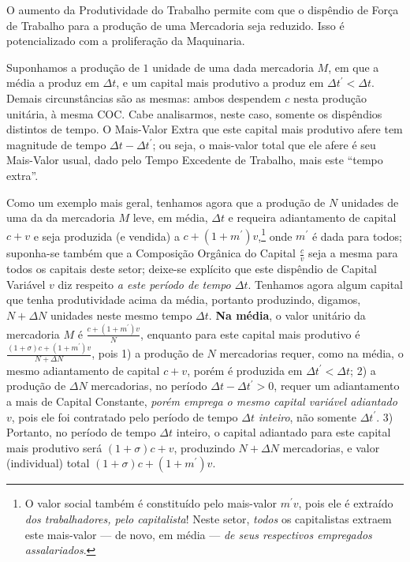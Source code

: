 \documentclass[12pt]{article}
\numberwithin{equation}{section}
\theoremstyle{plain}
\theoremstyle{definition}
\theoremstyle{remark}
\begin{document}
O aumento da Produtividade do Trabalho permite com que o dispêndio de Força de Trabalho para a produção de uma Mercadoria seja reduzido. Isso é potencializado com a proliferação da Maquinaria.

Suponhamos a produção de \(1\) unidade de uma dada mercadoria \(M\), em que a média a produz em \(\Delta t\), e um capital mais produtivo a produz em \(\Delta t^{\prime}<\Delta t\). Demais circunstâncias são as mesmas: ambos despendem \(c\) nesta produção unitária, à mesma COC. Cabe analisarmos, neste caso, somente os dispêndios distintos de tempo. O Mais-Valor Extra que este capital mais produtivo afere tem magnitude de tempo \(\Delta t-\Delta t^{\prime}\); ou seja, o mais-valor total que ele afere é seu Mais-Valor usual, dado pelo Tempo Excedente de Trabalho, mais este ``tempo extra''.

Como um exemplo mais geral, tenhamos agora que a produção de \(N\) unidades de uma da da mercadoria \(M\) leve, em média, \(\Delta t\) e requeira adiantamento de capital \(c+v\) e seja produzida (e vendida) a \(c+(1+m^{\prime})v\),\footnote{O valor social também é constituído pelo mais-valor \(m^{\prime}v\), pois ele é extraído \textit{dos trabalhadores, pelo capitalista}! Neste setor, \textit{todos} os capitalistas extraem este mais-valor --- de novo, em média --- \textit{de seus respectivos empregados assalariados}.} onde \(m^\prime\) é dada para todos; suponha-se também que a Composição Orgânica do Capital \(\frac{c}{v}\) seja a mesma para todos os capitais deste setor; deixe-se explícito que este dispêndio de Capital Variável \(v\) diz respeito \textit{a este período de tempo \(\Delta t\)}. Tenhamos agora algum capital que tenha produtividade acima da média, portanto produzindo, digamos, \(N+\Delta N\) unidades neste mesmo tempo \(\Delta t\). \textbf{Na média}, o valor unitário da mercadoria \(M\) é \(\frac{c+(1+m^{\prime})v}{N}\), enquanto para este capital mais produtivo é \(\frac{(1+\sigma)c+(1+m^{\prime})v}{N+\Delta N}\), pois 1) a produção de \(N\) mercadorias requer, como na média, o mesmo adiantamento de capital \(c+v\), porém é produzida em \(\Delta t^{\prime}<\Delta t\); 2) a produção de \(\Delta N\) mercadorias, no período \(\Delta t-\Delta t^{\prime}>0\), requer um adiantamento a mais de Capital Constante, \textit{porém emprega o mesmo capital variável adiantado \(v\)}, pois ele foi contratado pelo período de tempo \(\Delta t\) \textit{inteiro}, não somente \(\Delta t^{\prime}\). 3) Portanto, no período de tempo \(\Delta t\) inteiro, o capital adiantado para este capital mais produtivo será \((1+\sigma)c + v\), produzindo \(N+\Delta N\) mercadorias, e valor (individual) total \((1+\sigma)c + (1+m^{\prime})v\).
\end{document}
